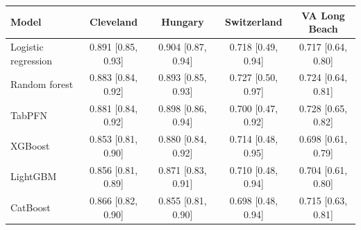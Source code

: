 \begin{tabular}{lcccc}
\toprule
Model & Cleveland & Hungary & Switzerland & VA Long Beach \\
\midrule
Logistic regression & 0.891 [0.85, 0.93] & 0.904 [0.87, 0.94] & 0.718 [0.49, 0.94] & 0.717 [0.64, 0.80] \\
Random forest & 0.883 [0.84, 0.92] & 0.893 [0.85, 0.93] & 0.727 [0.50, 0.97] & 0.724 [0.64, 0.81] \\
TabPFN & 0.881 [0.84, 0.92] & 0.898 [0.86, 0.94] & 0.700 [0.47, 0.92] & 0.728 [0.65, 0.82] \\
XGBoost & 0.853 [0.81, 0.90] & 0.880 [0.84, 0.92] & 0.714 [0.48, 0.95] & 0.698 [0.61, 0.79] \\
LightGBM & 0.856 [0.81, 0.89] & 0.871 [0.83, 0.91] & 0.710 [0.48, 0.94] & 0.704 [0.61, 0.80] \\
CatBoost & 0.866 [0.82, 0.90] & 0.855 [0.81, 0.90] & 0.698 [0.48, 0.94] & 0.715 [0.63, 0.81] \\
\bottomrule
\end{tabular}
